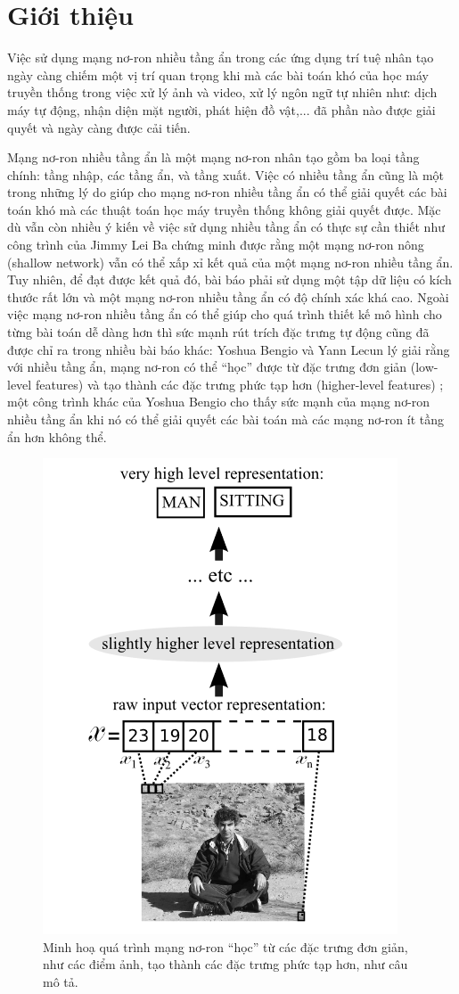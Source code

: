\chapter{Giới thiệu}
\label{Chapter1}

Việc sử dụng mạng nơ-ron nhiều tầng ẩn trong các ứng dụng trí tuệ nhân tạo ngày càng chiếm một vị trí quan trọng khi mà các bài toán khó của học máy truyền thống trong việc xử lý ảnh và video, xử lý ngôn ngữ tự nhiên như: dịch máy tự động, nhận diện mặt người, phát hiện đồ vật,... đã phần nào được giải quyết và ngày càng được cải tiến.

Mạng nơ-ron nhiều tầng ẩn là một mạng nơ-ron nhân tạo gồm ba loại tầng chính: tầng nhập, các tầng ẩn, và tầng xuất. Việc có nhiều tầng ẩn cũng là một trong những lý do giúp cho mạng nơ-ron nhiều tầng ẩn có thể giải quyết các bài toán khó mà các thuật toán học máy truyền thống không giải quyết được. Mặc dù vẫn còn nhiều ý kiến về việc sử dụng nhiều tầng ẩn có thực sự cần thiết như công trình của Jimmy Lei Ba \cite{ba2013dodeepnets} chứng minh được rằng một mạng nơ-ron nông (shallow network) vẫn có thể xấp xỉ kết quả của một mạng nơ-ron nhiều tầng ẩn. Tuy nhiên, để đạt được kết quả đó, bài báo phải sử dụng một tập dữ liệu có kích thước rất lớn và một mạng nơ-ron nhiều tầng ẩn có độ chính xác khá cao. Ngoài việc mạng nơ-ron nhiều tầng ẩn có thể giúp cho quá trình thiết kế mô hình cho từng bài toán dễ dàng hơn \cite{nielsen2015neural} thì sức mạnh rút trích đặc trưng tự động cũng đã được chỉ ra trong nhiều bài báo khác: Yoshua Bengio và Yann Lecun lý giải rằng với nhiều tầng ẩn, mạng nơ-ron có thể ``học'' được từ đặc trưng đơn giản (low-level features) và tạo thành các đặc trưng phức tạp hơn (higher-level features) \cite{bengio2007scaling}; một công trình khác của Yoshua Bengio cho thấy sức mạnh của mạng nơ-ron nhiều tầng ẩn khi nó có thể giải quyết các bài toán mà các mạng nơ-ron ít tầng ẩn hơn không thể\cite{bengio2009learning}.

\begin{figure}[htp]
\centering
\includegraphics[width=65 mm]{images/layers-features.png}
\caption{Minh hoạ quá trình mạng nơ-ron ``học'' từ các đặc trưng đơn giản, như các điểm ảnh, tạo thành các đặc trưng phức tạp hơn, như câu mô tả.\cite{bengio2009learning}}
\label{fig:layers-features}
\end{figure}

